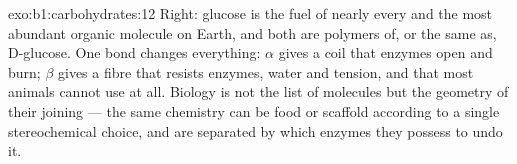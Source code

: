 \begin{solution}{exo:b1:carbohydrates:12}
Right: glucose is the fuel of nearly every  and  the most
abundant organic molecule on Earth, and both are polymers of, or the
same as, D-glucose. One bond changes everything: $\alpha$ gives a coil
that enzymes open and  burn; $\beta$ gives a fibre that resists
enzymes, water and tension, and that most animals cannot use at all.
Biology is not the list of molecules but the geometry of their
joining --- the same chemistry can be food or scaffold according to a
single stereochemical choice, and  are separated by which
enzymes they possess to undo it.
\end{solution}

